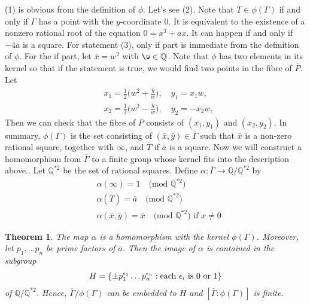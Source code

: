 \documentclass[11pt]{article}
\newcommand{\<}{\langle}
\renewcommand{\>}{\rangle}
\numberwithin{equation}{section}
\theoremstyle{plain}
\newtheorem{thm}{Theorem}[section]
\theoremstyle{definition}
\begin{document}
    (1) is obvious from the definition of \(\phi\). Let's see (2). Note that \( \overline{T} \in \phi(\Gamma)\) if and only if \(\Gamma\) has a point with the \(y\)-coordinate 0. It is equivalent to the existence of a nonzero rational root of the equation \( 0 = x^3 + ax \). It can happen if and only if \( -4a \) is a square. For statement (3), only if part is immediate from the definition of \(\phi\). For the if part, let \( \bar{x} = w^2 \) with \( \w \in \mathbb{Q} \). Note that \(\phi \) has two elements in its kernel so that if the statement is true, we would find two points in the fibre of \(\overline{P}\). Let 
    \begin{align*}
        &x_1 = \frac{1}{2} \Big( w^2  + \frac{\bar{y}}{w} \Big), \quad y_1 = x_1w, \\
        &x_2 = \frac{1}{2} \Big( w^2  - \frac{\bar{y}}{w} \Big), \quad y_2 = -x_2w,
    \end{align*}
    Then we can check that the fibre of \(\overline{P} \) consists of \( (x_1,y_1)\) and \((x_2,y_2)\). In summary, \( \phi(\Gamma) \) is the set consisting of \( (\bar{x}, \bar{y}) \in \overline{\Gamma}\) such that \(\bar{x}\) is a non-zero rational square, together with \(\overline{\infty}\), and \(\overline{T}\) if \(\bar{a}\) is a square. Now we will construct a homomorphism from \(\overline{\Gamma}\) to a finite group whose kernel fits into the description above.. Let \(\mathbb{Q}^{\ast2} \) be the set of rational squares. Define \( \alpha : \overline{\Gamma} \rightarrow \mathbb{Q}/\mathbb{Q}^{\ast2}\) by
    \begin{align*}
        &\alpha(\overline{\infty}) = 1  \quad \text{(mod \(\mathbb{Q}^{\ast2}\))}\\
        &\alpha(\overline{T}) = \bar{a}  \quad \text{(mod \(\mathbb{Q}^{\ast2}\))}\\
        &\alpha(\bar{x},\bar{y}) = \bar{x} \quad \text{(mod \(\mathbb{Q}^{\ast2})\) if \(x \ne 0 \)} 
    \end{align*}
    \begin{thm} The map \(\alpha\) is a homomorphism with the kernel \(\phi({\Gamma})\). Moreover, let \(p_1, \dots p_n \) be prime factors of \(\bar{a}\). Then the image of \(\alpha\) is contained in the subgroup
        \begin{align*}
            H = \{ \pm p_1^{\epsilon_1} \dots p_n^{\epsilon_n} : \text{each \( \epsilon_i \) is \(0\) or \(1\)} \}
        \end{align*}
     of \(\mathbb{Q}/\mathbb{Q}^{\ast2}\). Hence, \(\overline{\Gamma}/\phi(\Gamma)\) can be embedded to \(H\) and \([ \overline{\Gamma} : \phi(\Gamma) ]\) is finite.
    \end{thm}
\end{document}
